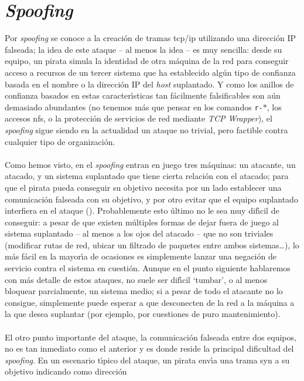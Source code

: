 \section{\it Spoofing}
Por {\it spoofing} se conoce a la creaci\'on de tramas {\sc tcp/ip} utilizando
una direcci\'on IP falseada; la idea de este ataque -- al menos la idea -- es 
muy sencilla: desde su equipo, un pirata simula la identidad de otra m\'aquina 
de la red para conseguir acceso a recursos de un tercer sistema que ha 
establecido alg\'un tipo de confianza basada en el nombre o la direcci\'on IP 
del {\it host} suplantado. Y como los anillos de confianza basados en estas 
caracter\'{\i}sticas tan f\'acilmente falsificables son a\'un demasiado 
abundantes (no tenemos m\'as que pensar en los comandos {\tt r-$\ast$}, los 
accesos {\sc nfs}, o la protecci\'on de servicios de red mediante {\it TCP 
Wrapper}), el {\it spoofing} sigue siendo en la actualidad un ataque no trivial,
pero factible contra cualquier tipo de organizaci\'on.\\
\\Como hemos visto, en el {\it spoofing} entran en juego tres m\'aquinas: un
atacante, un atacado, y un sistema suplantado que tiene cierta relaci\'on con
el atacado; para que el pirata pueda conseguir su objetivo necesita por un lado 
establecer una comunicaci\'on falseada con su objetivo, y por otro evitar que 
el equipo suplantado interfiera en el ataque (\cite{kn:tod96}). Probablemente 
esto \'ultimo no le sea muy dif\'{\i}cil de conseguir: a pesar de que existen
m\'ultiples formas de dejar fuera de juego al sistema suplantado -- al menos a
los ojos del atacado -- que no son triviales (modificar rutas de red, ubicar un
filtrado de paquetes entre ambos sistemas\ldots), lo m\'as f\'acil en la 
mayor\'{\i}a de ocasiones es simplemente lanzar una negaci\'on de servicio 
contra el sistema en cuesti\'on. Aunque en el punto siguiente hablaremos con 
m\'as detalle de estos ataques, no suele ser dif\'{\i}cil `tumbar', o al menos
bloquear parcialmente, un sistema medio; si a pesar de todo el atacante no lo
consigue, simplemente puede esperar a que desconecten de la red a la m\'aquina a
la que desea suplantar (por ejemplo, por cuestiones de puro mantenimiento).\\
\\El otro punto importante del ataque, la comunicaci\'on falseada entre dos
equipos, no es tan inmediato como el anterior y es donde reside la principal
dificultad del {\it spoofing}. En un escenario t\'{\i}pico del ataque, un
pirata env\'{\i}a una trama {\sc syn} a su objetivo indicando como direcci\'on 
